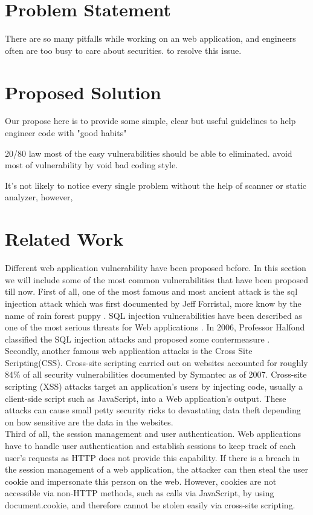 \documentclass[12pt, a4paper]{article}
\begin{document}
\section{Problem Statement}
There are so many pitfalls while working on an web application,
and engineers often are too busy to care about securities.
to resolve this issue.

\section{Proposed Solution}
Our propose here is to provide some simple, clear but useful guidelines
to help engineer code with "good habits"

20/80 law
most of the easy vulnerabilities should be able to eliminated.
avoid most of vulnerability by void bad coding style.

It's not likely to notice every single problem without the help of scanner or static analyzer,
however,


\section{Related Work}
Different web application vulnerability have been proposed before. In this section we will include some of the most common vulnerabilities that have been proposed till now. First of all, one of the most famous and most ancient attack is the sql injection attack which was first documented by Jeff Forristal, more know by the name of rain forest puppy \cite{Jeff}.  SQL injection vulnerabilities have been described as one of the most serious threats for Web applications \cite{Aucsmith} \cite{TO}. In 2006, Professor Halfond classified the SQL injection attacks and proposed some contermeasure \cite{halfond06mar}.\\

Secondly, another famous web application attacks is the Cross Site Scripting(CSS). Cross-site scripting carried out on websites accounted for roughly 84\% of all security vulnerabilities documented by Symantec as of 2007\cite{symantec}. Cross-site scripting (XSS) attacks target an application's users by injecting code, usually a client-side script such as JavaScript, into a Web application's output. These attacks can cause small petty security ricks to devastating data theft depending on how sensitive are the data in the websites.\\

Third of all, the session management and user authentication. Web applications have to handle user authentication and establish sessions to keep track of each user's requests as HTTP does not provide this capability. If there is a breach in the session management of a web application, the attacker can then steal the user cookie and impersonate this person on the web. However, cookies are not accessible via non-HTTP methods, such as calls via JavaScript, by using document.cookie, and therefore cannot be stolen easily via cross-site scripting\cite{symantec}.\\
\end{document}
